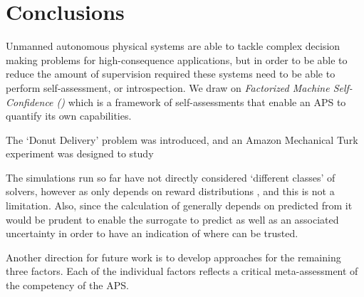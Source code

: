 \section{Conclusions} \label{sec:conclusions}
Unmanned autonomous physical systems are able to tackle complex decision making problems for high-consequence applications, but in order to be able to reduce the amount of supervision required these systems need to be able to perform self-assessment, or introspection. We draw on \emph{Factorized Machine Self-Confidence (\famsec)} which is a framework of self-assessments that enable an APS to quantify its own capabilities.

The `Donut Delivery' problem was introduced, and an Amazon Mechanical Turk experiment was designed to study 

The simulations run so far have not directly considered `different classes' of solvers, however as \xQ{} only depends on reward distributions \rwd{}, and \rwdstar{} this is not a limitation. Also, since the calculation of \xQ{} generally depends on \rwdstar{} predicted from \surrogate{} it would be prudent to enable the surrogate to predict \rwdstar{} as well as an associated uncertainty in order to have an indication of where \surrogate{} can be trusted.

Another direction for future work is to develop approaches for the remaining three \famsec{} factors. Each of the individual factors reflects a critical meta-assessment of the competency of the APS.
